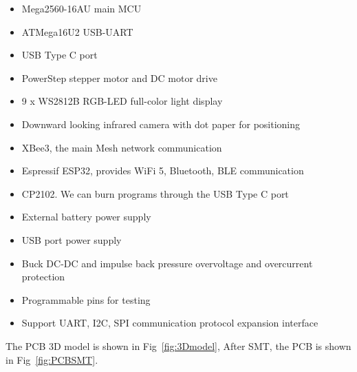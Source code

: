 \documentclass[sigconf]{acmart}
\begin{document}
\begin{itemize}
  \item Mega2560-16AU main MCU
  \item ATMega16U2 USB-UART
  \item USB Type C port
  \item PowerStep stepper motor and DC motor drive
  \item 9 x WS2812B RGB-LED full-color light display
  \item Downward looking infrared camera with dot paper for positioning
  \item XBee3, the main Mesh network communication
  \item Espressif ESP32, provides WiFi 5, Bluetooth, BLE communication
  \item CP2102. We can burn programs through the USB Type C port
  \item External battery power supply
  \item USB port power supply
  \item Buck DC-DC and impulse back pressure overvoltage and overcurrent protection
  \item Programmable pins for testing
  \item Support UART, I2C, SPI communication protocol expansion interface
\end{itemize}

The PCB 3D model is shown in Fig~\ref{fig:3Dmodel}, After SMT, the PCB is shown in Fig~\ref{fig:PCBSMT}.



\end{document}
